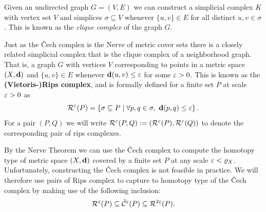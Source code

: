 Given an undirected graph $G = (V, E)$ we can construct a simplicial complex $K$ with vertex set $V$ and simplices $\sigma\subseteq V$ whenever $\{u,v\}\in E$ for all distinct $u, v\in\sigma$.
This is known as the \emph{clique complex} of the graph $G$.

Just as the \v Cech complex is the Nerve of metric cover sets there is a closely related simplicial complex that is the clique complex of a neighborhood graph.
That is, a graph $G$ with vertices $V$ corresponding to points in a metric space $(X,\mathbf{d})$ and $\{u,v\}\in E$ whenever $\mathbf{d}(u,v)\leq \varepsilon$ for some $\varepsilon > 0$.
This is known as the \textbf{(Vietoris-)Rips complex}, and is formally defined for a finite set $P$ at scale $\varepsilon > 0$ as
\[ \mathcal{R}^\varepsilon(P) = \left\{\sigma \subseteq P\mid \forall p,q\in\sigma,\ \mathbf{d}(p, q)\leq \varepsilon\right\}. \]
For a pair $(P, Q)$ we will write $\mathcal{R}^\varepsilon(P,Q) := (\mathcal{R}^\varepsilon(P), \mathcal{R}^\varepsilon(Q))$ to denote the corresponding pair of rips complexes.

By the Nerve Theorem we can use the \v Cech complex to compute the homotopy type of metric space $(X, \mathbf{d})$ covered by a finite set $P$ at any scale $\varepsilon < \varrho_X$.
Unfortunately, constructing the \v Cech complex is not feasible in practice.
We will therefore use pairs of Rips complex to capture to homotopy type of the \v Cech complex by making use of the following inclusion:
\[ \mathcal{R}^\varepsilon(P) \subseteq \check{\mathcal{C}}^\varepsilon(P)\subseteq \mathcal{R}^{2\varepsilon}(P).\]
